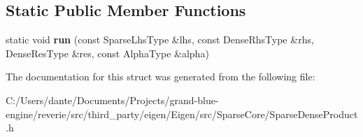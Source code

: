\subsection*{Static Public Member Functions}
\begin{DoxyCompactItemize}
\item 
\mbox{\label{struct_eigen_1_1internal_1_1sparse__time__dense__product__impl_3_01_sparse_lhs_type_00_01_dense_4902bcccfe44923f57955b34ebedf211_abad882c53c0c8533a858d2ec80d0044c}} 
static void {\bfseries run} (const Sparse\+Lhs\+Type \&lhs, const Dense\+Rhs\+Type \&rhs, Dense\+Res\+Type \&res, const Alpha\+Type \&alpha)
\end{DoxyCompactItemize}


The documentation for this struct was generated from the following file\+:\begin{DoxyCompactItemize}
\item 
C\+:/\+Users/dante/\+Documents/\+Projects/grand-\/blue-\/engine/reverie/src/third\+\_\+party/eigen/\+Eigen/src/\+Sparse\+Core/Sparse\+Dense\+Product.\+h\end{DoxyCompactItemize}
